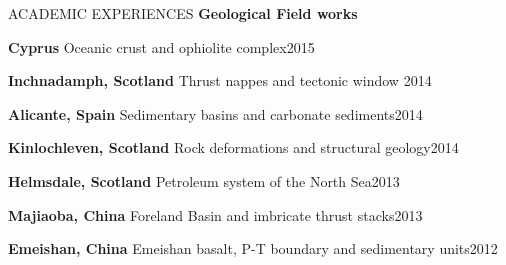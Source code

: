 \documentclass{resume} %
\newenvironment{indentpar}[1]%
  {\begin{list}{}%
          {\setlength{\leftmargin}{#1}}%
          \item[]%
  }
  {\end{list}}
\begin{document}
\begin{rSection}{ACADEMIC EXPERIENCES}
\textbf{Geological Field works}
\begin{indentpar}{0.5cm}
\textbf{Cyprus} Oceanic crust and ophiolite complex\hfill{2015}

\textbf{Inchnadamph, Scotland} Thrust nappes and tectonic window \hfill{2014}

\textbf{Alicante, Spain} Sedimentary basins and carbonate sediments\hfill{2014}

\textbf{Kinlochleven, Scotland} Rock deformations and structural geology\hfill{2014}

\textbf{Helmsdale, Scotland} Petroleum system of the North Sea\hfill{2013}

\textbf{Majiaoba, China} Foreland Basin and imbricate thrust stacks\hfill{2013}

\textbf{Emeishan, China} Emeishan basalt, P-T boundary and sedimentary units\hfill{2012}

\end{indentpar}
\end{rSection}
\end{document}
